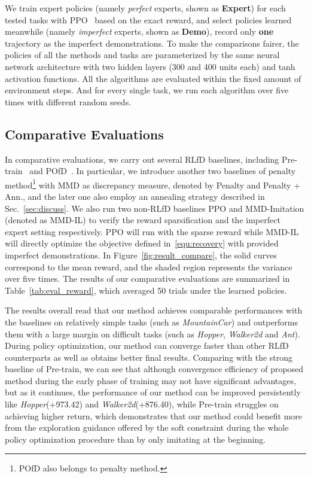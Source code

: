 \documentclass[letterpaper]{article} %
\begin{document}
We train expert policies (namely \textit{perfect} experts, shown as \textbf{Expert}) for each tested tasks with PPO~\cite{PPO} based on the exact reward, and select policies learned meanwhile (namely \textit{imperfect} experts, shown as \textbf{Demo}), record only \textbf{one} trajectory as the imperfect demonstrations. To make the comparisons fairer, the policies of all the methods and tasks are parameterized by the same neural network architecture with two hidden layers (300 and 400 units each) and tanh activation functions. All the algorithms are evaluated within the fixed amount of environment steps. And for every single task, we run each algorithm over five times with different random seeds.

\subsection{Comparative Evaluations}\label{sec:exp_comp}
In comparative evaluations, we carry out several RLfD baselines, including Pre-train~\cite{pretrain1} and POfD~\cite{pofd}. In particular, we introduce another two baselines of penalty method\footnote{POfD also belongs to penalty method.} with MMD as discrepancy measure, denoted by Penalty and Penalty + Ann., and the later one also employ an annealing strategy described in Sec.~\ref{sec:discuss}. We also run two non-RLfD baselines PPO and MMD-Imitation (denoted as MMD-IL) to verify the reward sparsification and the imperfect expert setting respectively. PPO will run with the sparse reward while MMD-IL will directly optimize the objective defined in~\eqref{equ:recovery} with provided imperfect demonstrations. In Figure~\ref{fig:result_compare}, the solid curves correspond to the mean reward, and the shaded region represents the variance over five times. The results of our comparative evaluations are summarized in Table~\ref{tab:eval_reward}, which averaged 50 trials under the learned policies.

The results overall read that our method achieves comparable performances with the baselines on relatively simple tasks (such as \textit{MountainCar}) and outperforms them with a large margin on difficult tasks (such as \textit{Hopper}, \textit{Walker2d} and \textit{Ant}). During policy optimization, our method can converge faster than other RLfD counterparts as well as obtains better final results. Comparing with the strong baseline of Pre-train, we can see that although convergence efficiency of proposed method during the early phase of training may not have significant advantages, but as it continues, the performance of our method can be improved persistently like \textit{Hopper}(+973.42) and \textit{Walker2d}(+876.40), while Pre-train struggles on achieving higher return, which demonstrates that our method could benefit more from the exploration guidance offered by the soft constraint during the whole policy optimization procedure than by only imitating at the beginning.
\end{document}

